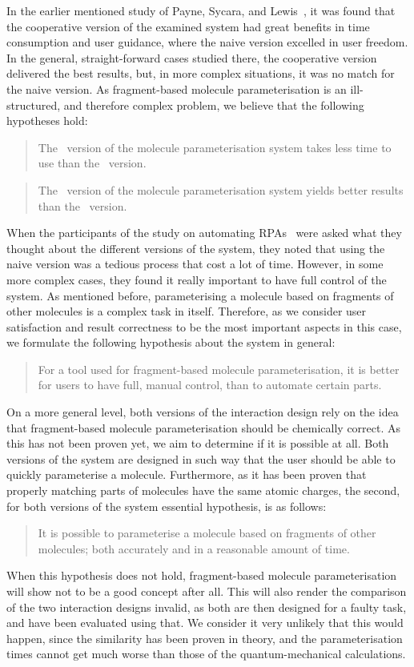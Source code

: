 In the earlier mentioned study of Payne, Sycara, and Lewis~\cite{payne2000varying}, it was found that the cooperative version of the examined system had great benefits in time consumption and user guidance, where the naive version excelled in user freedom. In the general, straight-forward cases studied there, the cooperative version delivered the best results, but, in more complex situations, it was no match for the naive version. As fragment-based molecule parameterisation is an ill-structured, and therefore complex problem, we believe that the following hypotheses hold:
\begin{quote}
The \IDb\ version of the molecule parameterisation system takes less time to use than the \IDa\ version.
\end{quote}
\begin{quote}
The \IDa\ version of the molecule parameterisation system yields better results than the \IDb\ version.
\end{quote}

When the participants of the study on automating RPAs~\cite{payne2000varying} were asked what they thought about the different versions of the system, they noted that using the naive version was a tedious process that cost a lot of time. However, in some more complex cases, they found it really important to have full control of the system. As mentioned before, parameterising a molecule based on fragments of other molecules is a complex task in itself. Therefore, as we consider user satisfaction and result correctness to be the most important aspects in this case, we formulate the following hypothesis about the system in general:
\begin{quote}
For a tool used for fragment-based molecule parameterisation, it is better for users to have full, manual control, than to automate certain parts.
\end{quote}

On a more general level, both versions of the interaction design rely on the idea that fragment-based molecule parameterisation should be chemically correct. As this has not been proven yet, we aim to determine if it is possible at all. Both versions of the system are designed in such way that the user should be able to quickly parameterise a molecule. Furthermore, as it has been proven that properly matching parts of molecules have the same atomic charges, the second, for both versions of the system essential hypothesis, is as follows:
\begin{quote}
It is possible to parameterise a molecule based on fragments of other molecules; both accurately and in a reasonable amount of time.
\end{quote}

When this hypothesis does not hold, fragment-based molecule parameterisation will show not to be a good concept after all. This will also render the comparison of the two interaction designs invalid, as both are then designed for a faulty task, and have been evaluated using that. We consider it very unlikely that this would happen, since the similarity has been proven in theory, and the parameterisation times cannot get much worse than those of the quantum-mechanical calculations.

